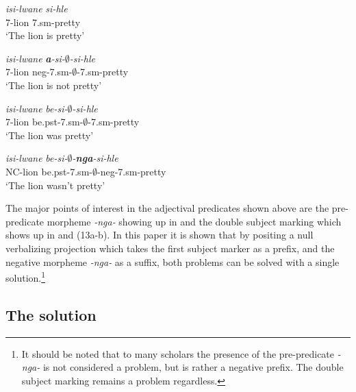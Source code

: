 \documentclass[output=paper]{langsci/langscibook}
\newcommand{\nga}[0]{\textit{-nga- }}
\begin{document}
\begin{exe}
\ex\label{ex:burkholder:12} \begin{xlist}
\ex\label{ex:burkholder:12a} \gll \textit{isi-lwane} \textit{si-hle}\\
       7-lion 7.{\sc sm}-pretty\\
    \glt `The lion is pretty' 

\ex\label{ex:burkholder:12b} \gll \textit{isi-lwane} \textit{\textbf{a}-si-$\emptyset$-si-hle}\\
       7-lion {\sc neg}-7.{\sc sm}-$\emptyset$-7.{\sc sm}-pretty\\
    \glt `The lion is not pretty' 
\end{xlist}
\end{exe}

\begin{exe}
\ex\label{ex:burkholder:13} \begin{xlist}
\ex\label{ex:burkholder:13a} \gll \textit{isi-lwane} \textit{be-si-$\emptyset$-si-hle}\\
       7-lion be.{\sc pst}-7.{\sc sm}-$\emptyset$-7.{\sc sm}-pretty\\
    \glt `The lion was pretty' 

\ex\label{ex:burkholder:13b} \gll \textit{isi-lwane} \textit{be-si-$\emptyset$-\textbf{nga}-si-hle}\\
       NC-lion be.{\sc pst}-7.{\sc sm}-$\emptyset$-{\sc neg}-7.{\sc sm}-pretty\\
    \glt `The lion wasn't pretty' 
\end{xlist}
\end{exe}

The major points of interest in the adjectival predicates shown above are the pre-predicate morpheme \nga showing up in  and the double subject marking which shows up in  and (13a-b). In this paper it is shown that by positing a null verbalizing projection which takes the first subject marker as a prefix, and the negative morpheme \nga as a suffix, both problems can be solved with a single solution.\footnote{It should be noted that to many scholars the presence of the pre-predicate \nga is not considered a problem, but is rather a negative prefix. The double subject marking remains a problem regardless.}

\subsection {The solution}\label{sec:burkholder:3.2}
\end{document}
